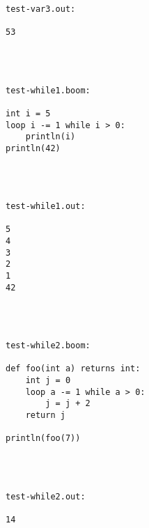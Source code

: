 \documentclass{article}
\begin{document}
\begin{verbatim}
test-var3.out: 

53




test-while1.boom: 

int i = 5
loop i -= 1 while i > 0:
	println(i)
println(42)




test-while1.out: 

5
4
3
2
1
42




test-while2.boom: 

def foo(int a) returns int:
	int j = 0
	loop a -= 1 while a > 0:
		j = j + 2
	return j

println(foo(7))




test-while2.out: 

14

\end{verbatim}
\end{document}

